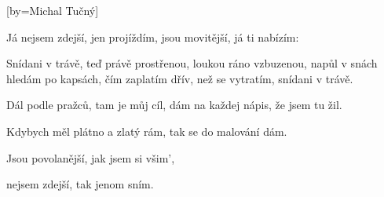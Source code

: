 [by={Michal Tučný}]

\beginverse{}
Já nejsem zdejší, jen projíždím,
jsou movitější, já ti nabízím:
\endverse{}

\beginchorus{}
Snídani v trávě, teď právě prostřenou,
loukou ráno vzbuzenou, napůl v snách
hledám po kapsách, čím zaplatím
dřív, než se vytratím, snídani v trávě.
\endchorus{}

\beginverse{}
Dál podle pražců, tam je můj cíl,
dám na každej nápis, že jsem tu žil.
\endverse{}

\beginchorus{}
\phantom{}
\endchorus{}

\beginverse*{}
Kdybych měl plátno a zlatý rám,
tak se do malování dám.
\endverse{}

\beginverse{}
Jsou povolanější, jak jsem si všim',
\endverse{}

\beginverse{}
nejsem zdejší, tak jenom sním.
\endverse{}

\beginchorus{}
\phantom{}
\endchorus{}

\endsong{}
